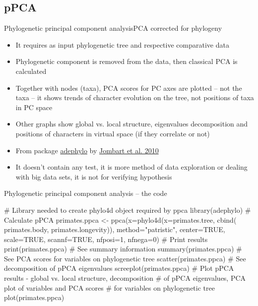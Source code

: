 \documentclass[compress, ucs, xelatex, 11pt, xcolor=svgnames,
  hyperref={
    bookmarks=true,
    unicode=true,
    colorlinks=true,
    pdftitle={Molecular data in R},
    plainpages=false,
    pdfauthor={Vojtech Zeisek},
    pdfsubject={Course about phylogeny and evolution in R},
    pdfcreator={XeLaTeX},
    pdfkeywords={R, evolution, phylogeny, molecular data},
    linkcolor=Tomato,
    anchorcolor=SaddleBrown,
    citecolor=Goldenrod,
    filecolor=DarkMagenta,
    menucolor=Sienna,
    urlcolor=DarkTurquoise,
    pdftex},
  url={hyphens, lowtilde} %
  ]{beamer}
\begin{document}
\subsection{pPCA}

\begin{frame}{Phylogenetic principal component analysis}{PCA corrected for phylogeny}
  \begin{itemize}
    \item It requires as input phylogenetic tree and respective comparative data
    \item Phylogenetic component is removed from the data, then classical PCA is calculated
    \item Together with nodes (taxa), PCA scores for PC axes are plotted -- not the taxa -- it shows trends of character evolution on the tree, not positions of taxa in PC space
    \item Other graphs show global vs. local structure, eigenvalues decomposition and positions of characters in virtual space (if they correlate or not)
    \item From package \href{https://academic.oup.com/bioinformatics/article-lookup/doi/10.1093/bioinformatics/btq292}{adephylo} by \href{http://www.sciencedirect.com/science/article/pii/S0022519310001736}{Jombart et al. 2010}
    \item It doesn't contain any test, it is more method of data exploration or dealing with big data sets, it is not for verifying hypothesis
  \end{itemize}
\end{frame}

\begin{frame}[fragile]{Phylogenetic principal component analysis -- the code}
  \begin{spluscode}
    # Library needed to create phylo4d object required by ppca
    library(adephylo)
    # Calculate pPCA
    primates.ppca <- ppca(x=phylo4d(x=primates.tree, cbind(
      primates.body, primates.longevity)), method="patristic",
      center=TRUE, scale=TRUE, scannf=TRUE, nfposi=1, nfnega=0)
    # Print results
    print(primates.ppca)
    # See summary information
    summary(primates.ppca)
    # See PCA scores for variables on phylogenetic tree
    scatter(primates.ppca)
    # See decomposition of pPCA eigenvalues
    screeplot(primates.ppca)
    # Plot pPCA results - global vs. local structure, decomposition
    # of pPCA eigenvalues, PCA plot of variables and PCA scores
    # for variables on phylogenetic tree
    plot(primates.ppca)
  \end{spluscode}
\end{frame}
\end{document}
